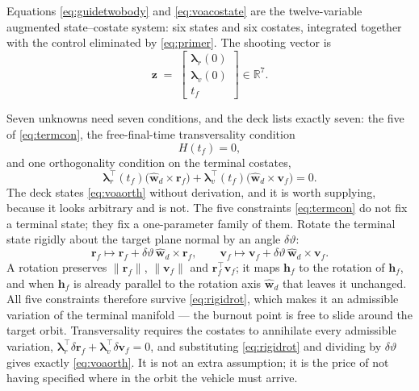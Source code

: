 \documentclass[11pt]{article}
\begin{document}
Equations \eqref{eq:guidetwobody} and \eqref{eq:voacostate} are the
twelve-variable augmented state--costate system: six states and six costates,
integrated together with the control eliminated by \eqref{eq:primer}. The
shooting vector is
\begin{equation}
  \mathbf{z} \;=\;
  \begin{bmatrix}\boldsymbol{\lambda}_r(0) \\
                 \boldsymbol{\lambda}_v(0) \\
                 t_f\end{bmatrix} \in \mathbb{R}^{7} .
  \label{eq:voaz}
\end{equation}

Seven unknowns need seven conditions, and the deck lists exactly seven: the
five of \eqref{eq:termcon}, the free-final-time transversality condition
\begin{equation}
  H(t_f) = 0 ,
  \label{eq:voatrans}
\end{equation}
and one orthogonality condition on the terminal costates,
\begin{equation}
  \boldsymbol{\lambda}_r^{\!\top}(t_f)\bigl(\hat{\mathbf{w}}_d\times\mathbf{r}_f\bigr)
  + \boldsymbol{\lambda}_v^{\!\top}(t_f)\bigl(\hat{\mathbf{w}}_d\times\mathbf{v}_f\bigr)
  = 0 .
  \label{eq:voaorth}
\end{equation}
The deck states \eqref{eq:voaorth} without derivation, and it is worth
supplying, because it looks arbitrary and is not. The five constraints
\eqref{eq:termcon} do not fix a terminal state; they fix a one-parameter
family of them. Rotate the terminal state rigidly about the target plane
normal by an angle $\delta\vartheta$:
\begin{equation}
  \mathbf{r}_f \mapsto \mathbf{r}_f
    + \delta\vartheta\,\hat{\mathbf{w}}_d\times\mathbf{r}_f ,
  \qquad
  \mathbf{v}_f \mapsto \mathbf{v}_f
    + \delta\vartheta\,\hat{\mathbf{w}}_d\times\mathbf{v}_f .
  \label{eq:rigidrot}
\end{equation}
A rotation preserves $\|\mathbf{r}_f\|$, $\|\mathbf{v}_f\|$ and
$\mathbf{r}_f^{\!\top}\mathbf{v}_f$; it maps $\mathbf{h}_f$ to the rotation of
$\mathbf{h}_f$, and when $\mathbf{h}_f$ is already parallel to the rotation
axis $\hat{\mathbf{w}}_d$ that leaves it unchanged. All five constraints
therefore survive \eqref{eq:rigidrot}, which makes it an admissible variation
of the terminal manifold --- the burnout point is free to slide around the
target orbit. Transversality requires the costates to annihilate every
admissible variation, $\boldsymbol{\lambda}_r^{\!\top}\delta\mathbf{r}_f +
\boldsymbol{\lambda}_v^{\!\top}\delta\mathbf{v}_f = 0$, and substituting
\eqref{eq:rigidrot} and dividing by $\delta\vartheta$ gives exactly
\eqref{eq:voaorth}. It is not an extra assumption; it is the price of not
having specified where in the orbit the vehicle must arrive.
\end{document}
